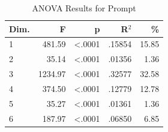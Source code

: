 \begin{table}[H]
  \centering
  \caption{ANOVA Results for Prompt}
  \label{tab:anova_prompt}
  \begin{tabular}{l r r r r}
    Dim. & F & p & R$^2$ & \% \\
    \hline
    1 & 481.59 & <.0001 & .15854 & 15.85 \\
    2 & 35.14 & <.0001 & .01356 & 1.36 \\
    3 & 1234.97 & <.0001 & .32577 & 32.58 \\
    4 & 374.50 & <.0001 & .12779 & 12.78 \\
    5 & 35.27 & <.0001 & .01361 & 1.36 \\
    6 & 187.97 & <.0001 & .06850 & 6.85 \\
  \end{tabular}
\end{table}
